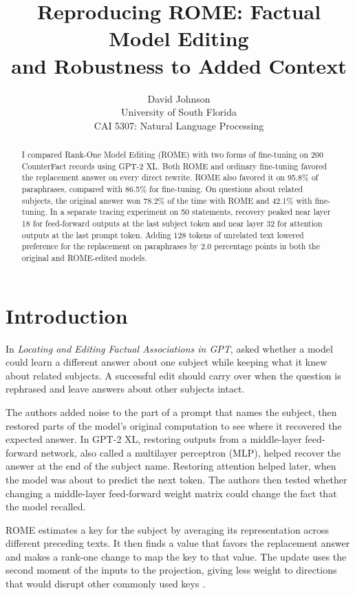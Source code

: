 \documentclass[11pt]{article}
\title{Reproducing ROME: Factual Model Editing\\and Robustness to Added Context}
\author{David Johnson\\University of South Florida\\CAI 5307: Natural Language Processing}
\begin{document}
\maketitle\raggedbottom
\begin{abstract}
I compared Rank-One Model Editing (ROME) with two forms of fine-tuning on 200 CounterFact records using GPT-2 XL. Both ROME and ordinary fine-tuning favored the replacement answer on every direct rewrite. ROME also favored it on 95.8\% of paraphrases, compared with 86.5\% for fine-tuning. On questions about related subjects, the original answer won 78.2\% of the time with ROME and 42.1\% with fine-tuning. In a separate tracing experiment on 50 statements, recovery peaked near layer 18 for feed-forward outputs at the last subject token and near layer 32 for attention outputs at the last prompt token. Adding 128 tokens of unrelated text lowered preference for the replacement on paraphrases by 2.0 percentage points in both the original and ROME-edited models.
\end{abstract}

\section{Introduction}
In \textit{Locating and Editing Factual Associations in GPT}, \citet{meng2022locating} asked whether a model could learn a different answer about one subject while keeping what it knew about related subjects. A successful edit should carry over when the question is rephrased and leave answers about other subjects intact.

The authors added noise to the part of a prompt that names the subject, then restored parts of the model's original computation to see where it recovered the expected answer. In GPT-2 XL, restoring outputs from a middle-layer feed-forward network, also called a multilayer perceptron (MLP), helped recover the answer at the end of the subject name. Restoring attention helped later, when the model was about to predict the next token. The authors then tested whether changing a middle-layer feed-forward weight matrix could change the fact that the model recalled.

ROME estimates a key for the subject by averaging its representation across different preceding texts. It then finds a value that favors the replacement answer and makes a rank-one change to map the key to that value. The update uses the second moment of the inputs to the projection, giving less weight to directions that would disrupt other commonly used keys \citep{meng2022locating}.
\end{document}
